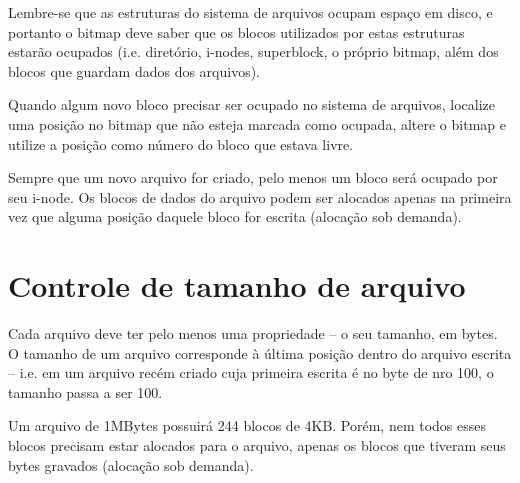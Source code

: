 \documentclass[a4paper, oneside,12pt]{article}
\begin{document}
Lembre-se que as estruturas do sistema de arquivos ocupam espaço em disco, e portanto o bitmap deve saber que os blocos utilizados por estas estruturas estarão ocupados (i.e. diretório, i-nodes, superblock, o próprio bitmap, além dos blocos que guardam dados dos arquivos).

Quando algum novo bloco precisar ser ocupado no sistema de arquivos, localize uma posição no bitmap que não esteja marcada como ocupada, altere o bitmap e utilize a posição como número do bloco que estava livre.

Sempre que um novo arquivo for criado, pelo menos um bloco será ocupado por seu i-node. Os blocos de dados do arquivo podem ser alocados apenas na primeira vez que alguma posição daquele bloco for escrita (alocação sob demanda).

\section{Controle de tamanho de arquivo}
\label{sub:controle_de_tamanho_de_arquivo}

Cada arquivo deve ter pelo menos uma propriedade -- o seu tamanho, em bytes. O tamanho de um arquivo corresponde à última posição dentro do arquivo escrita -- i.e. em um arquivo recém criado cuja primeira escrita é no byte de nro 100, o tamanho passa a ser 100.

Um arquivo de 1MBytes possuirá 244 blocos de 4KB. Porém, nem todos esses blocos precisam estar alocados para o arquivo, apenas os blocos que tiveram seus bytes gravados (alocação sob demanda).
\end{document}
